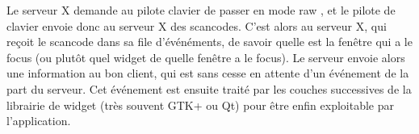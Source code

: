 Le serveur X demande au pilote clavier de passer en mode raw \cite{gun}, et le pilote de clavier envoie donc au serveur X des scancodes. C'est alors au serveur X, qui reçoit le scancode dans sa file d'événéments, de savoir quelle est la fenêtre qui a le focus (ou plutôt quel widget de quelle fenêtre a le focus). Le serveur envoie alors une information au bon client, qui est sans cesse en attente d'un événement de la part du serveur. Cet événement est ensuite traité par les couches successives de la librairie de widget (très souvent GTK+ ou Qt) pour être enfin exploitable par l'application.
